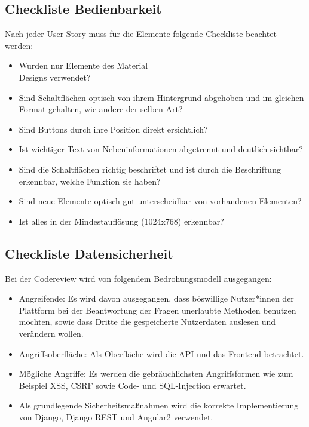 \documentclass[accentcolor=tud0b,12pt,paper=a4]{tudreport}
\begin{document}
\subsection{Checkliste Bedienbarkeit}
Nach jeder User Story muss für die Elemente folgende Checkliste beachtet werden:
\begin{multicols}{2}
	\begin{itemize}
		\renewcommand{\labelitemi}{\scriptsize$\square$}
		\item Wurden nur Elemente des Material\\ Designs verwendet?
		\item Sind Schaltflächen optisch von ihrem Hintergrund abgehoben und im gleichen Format gehalten, wie andere der selben Art?
		\item Sind Buttons durch ihre Position direkt ersichtlich?
		\item Ist wichtiger Text von Nebeninformationen abgetrennt und deutlich sichtbar?
		\item Sind die Schaltflächen richtig beschriftet und ist durch die Beschriftung erkennbar, welche Funktion sie haben?
		\item Sind neue Elemente optisch gut unterscheidbar von vorhandenen Elementen?
		\item Ist alles in der Mindestauflösung (1024x768) erkennbar?
	\end{itemize}
\end{multicols}

\subsection{Checkliste Datensicherheit}
Bei der Codereview wird von folgendem Bedrohungsmodell ausgegangen:
\begin{multicols}{2}
\begin{itemize}
    \item Angreifende: Es wird davon ausgegangen, dass böswillige Nutzer*innen der Plattform bei der Beantwortung der Fragen unerlaubte Methoden benutzen möchten, sowie dass Dritte die gespeicherte Nutzerdaten auslesen und verändern wollen.
    \item Angriffsoberfläche: Als Oberfläche wird die API und das Frontend betrachtet.
    \item Mögliche Angriffe: Es werden die gebräuchlichsten Angriffsformen wie zum Beispiel XSS, CSRF sowie Code- und SQL-Injection erwartet.
    \item Als grundlegende Sicherheitsmaßnahmen wird die korrekte Implementierung von Django, Django REST und Angular2 verwendet.
\end{itemize}
\end{multicols}
\end{document}
